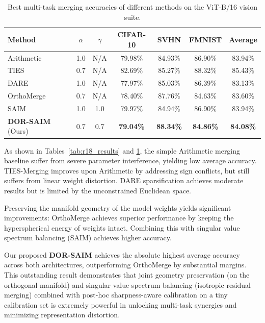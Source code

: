 \documentclass{article}
\begin{document}
\begin{table}[ht]
\caption{Best multi-task merging accuracies of different methods on the ViT-B/16 vision suite.}
\label{tab:vit_results}
\vskip 0.15in
\begin{center}
\begin{small}
\begin{tabular} {lcccccc}
\toprule
\textbf{Method} & \textbf{$\alpha$} & \textbf{$\gamma$} & \textbf{CIFAR-10} & \textbf{SVHN} & \textbf{FMNIST} & \textbf{Average} \\
\midrule
Arithmetic & 1.0 & N/A & 79.98\% & 84.93\% & 86.90\% & 83.94\% \\
TIES & 0.7 & N/A & 82.69\% & 85.27\% & 88.32\% & 85.43\% \\
DARE & 1.0 & N/A & 77.97\% & 85.03\% & 86.39\% & 83.13\% \\
OrthoMerge & 0.7 & N/A & 78.40\% & 87.76\% & 84.63\% & 83.60\% \\
SAIM & 1.0 & 1.0 & 79.97\% & 84.94\% & 86.90\% & 83.94\% \\
\midrule
\textbf{DOR-SAIM} (Ours) & 0.7 & 0.7 & \textbf{79.04\%} & \textbf{88.34\%} & \textbf{84.86\%} & \textbf{84.08\%} \\
\bottomrule
\end{tabular}
\end{small}
\end{center}
\vskip -0.1in
\end{table}

As shown in Tables~\ref{tab:r18_results} and \ref{tab:vit_results}, the simple Arithmetic merging baseline suffer from severe parameter interference, yielding low average accuracy. TIES-Merging improves upon Arithmetic by addressing sign conflicts, but still suffers from linear weight distortion. DARE sparsification achieves moderate results but is limited by the unconstrained Euclidean space.

Preserving the manifold geometry of the model weights yields significant improvements: OrthoMerge achieves superior performance by keeping the hyperspherical energy of weights intact. Combining this with singular value spectrum balancing (SAIM) achieves higher accuracy.

Our proposed \textbf{DOR-SAIM} achieves the absolute highest average accuracy across both architectures, outperforming OrthoMerge by substantial margins. This outstanding result demonstrates that joint geometry preservation (on the orthogonal manifold) and singular value spectrum balancing (isotropic residual merging) combined with post-hoc sharpness-aware calibration on a tiny calibration set is extremely powerful in unlocking multi-task synergies and minimizing representation distortion.
\end{document}
